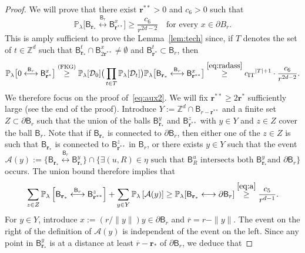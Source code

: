 \documentclass[AHL,Unicode,longabstracts]{cedram}
\newcommand{\rbf}{\mathbf{r}}
\DeclareMathOperator{\IT}{IT}
\DeclareMathOperator{\Fkg}{(FKG)}
\begin{document}
\begin{proof}
We will prove that there exist ${\rbf^{**}}>0$ and $c_6>0$ such that
\begin{equation}\label{eq:aux2}
{\mathbb P}_\lambda \big[\mathsf B_{\mathbf r_*} \stackrel{\mathsf B_r}{\longleftrightarrow} \mathsf B_{{\rbf^{**}}}^x \big] \geq \frac{c_6}{r^{2d - 2 }}\quad\text{for every }x\in\mathsf \partial B_r.
\end{equation}
This is amply sufficient to prove the Lemma~\ref{lem:tech} since, if $T$ denotes the set of $t\in{\mathbb Z}^d$ such that $\mathsf B^t_{\mathbf r_*}\cap \mathsf B_{2{\rbf^{**}}}^x\ne \emptyset$ and $\mathsf B^t_{\rbf^*}\subset \mathsf B_r$, then
\[
{\mathbb P}_\lambda \big[0 \stackrel{\mathsf B_r}{\longleftrightarrow} \mathsf B^x_{\rbf^*} \big]\stackrel{\Fkg}\ge {\mathbb P}_\lambda[{\mathcal D}_0]\big(\prod_{t\in T}{\mathbb P}_\lambda[{\mathcal D}_t]\big){\mathbb P}_\lambda \big[\mathsf B_{\mathbf r_*} \stackrel{\mathsf B_r}{\longleftrightarrow} \mathsf B_{{\rbf^{**}}}^x \big]\stackrel{\eqref{eq:radass}}\ge {c_{\IT}}^{|T|+1}\cdot \frac{c_6}{r^{2d - 2 }}.
\]
We therefore focus on the proof of~\eqref{eq:aux2}. We will fix ${\rbf^{**}}\ge 2 {\rbf^*}$ sufficiently large (see the end of the proof). Introduce $Y:={\mathbb Z}^d\cap \mathsf B_{r-{\rbf^{**}}}$ and a finite set $Z \subset \partial \mathsf B_r$ such that the union of the balls $\mathsf B_{\rbf_*}^{y}$ and $
\mathsf B_{{\rbf^{**}}}^{z}$ with $y \in Y$ and $z \in Z$ cover the ball $\mathsf B_r$. Note that if $\mathsf B_{\mathbf r_*}$ is connected to $\partial\mathsf B_r$, then either one of the $z\in Z$ is such that $\mathsf B_{\mathbf r_*}$ is connected to $\mathsf B_{{\rbf^{**}}}^z$ in $\mathsf B_r$, or there exists $y\in Y$ such that the event
\[
{\mathcal A}(y) := \big\lbrace \mathsf B_{\mathbf r_*} \stackrel{\mathsf B_r}{\longleftrightarrow} \mathsf B_{\rbf_*}^{y} \big \rbrace \cap
\big\lbrace \exists(u,R)\in\eta \text{ such that } \mathsf B_R^u \text{ intersects both } \mathsf B_{\rbf_*}^{y} \text{and } \partial\mathsf B_r\big\rbrace
\]
occurs. The union bound therefore implies that
\begin{equation}\label{eq:1}
\sum_{z\in Z}{\mathbb P}_\lambda\left[\mathsf B_{\mathbf r_*} \stackrel{\mathsf B_r}{\longleftrightarrow} \mathsf B_{{\rbf^{**}}}^z\right]+\sum_{\substack{y\in Y}}{\mathbb P}_\lambda\left[{\mathcal A}(y)]\ge {\mathbb P}_\lambda[\mathsf B_{\mathbf r_*}\longleftrightarrow \partial\mathsf B_r\right]\stackrel{\eqref{eq:a}}\ge \frac{c_5}{r^{d-1}}.
\end{equation}
For $y\in Y$, introduce $x:=(r/\|y\|)y\in\partial\mathsf B_r$ and $\overline r=r-\|y\|$. The event on the right of the definition of ${\mathcal A}(y)$ is independent of the event on the left. Since any point in $\mathsf B_{\rbf_*}^{y}$ is at a distance at least $\overline r-{\rbf_*}$ of $\partial\mathsf B_r$, we deduce that

\end{proof}
\end{document}
